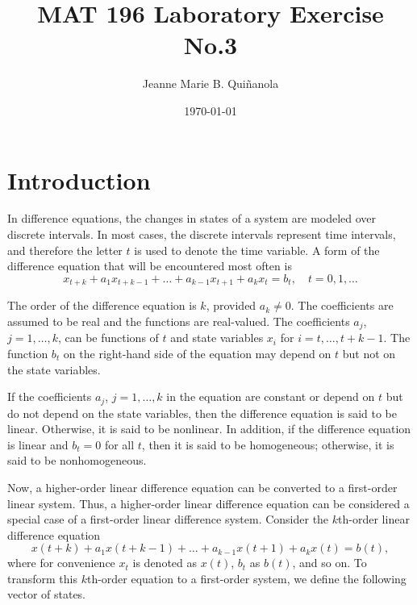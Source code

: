 \documentclass [a4paper]{article}
\title{MAT 196 Laboratory Exercise No.3}
\author{Jeanne Marie B. Quiñanola}
\date{\today}
\begin{document}
\maketitle

\section{Introduction}
In difference equations, the changes in states of a system are modeled over discrete intervals. In most cases, the discrete intervals represent time intervals, and therefore the letter \(t\) is used to denote the time variable.
A form of the difference equation that will be encountered most often is 
\[
x_{t + k} + a_1 x_{t+k-1} + \ldots + a_{k-1} x_{t+1} + a_k x_t = b_t, \quad t = 0, 1,\ldots\]

The order of the difference equation is \(k\), provided \(a_k \neq 0\). The coefficients are assumed to be real and the functions are real-valued. The coefficients \(a_j\), \(j = 1, \ldots, k\), can be functions of \(t\) and state variables \(x_i\) for \(i = t, \ldots, t + k - 1\). The function \(b_t\) on the right-hand side of the equation may depend on \(t\) but not on the state variables.

If the coefficients \(a_j\), \(j = 1, \ldots, k\) in the equation are constant or depend on \(t\) but do not depend on the state variables, then the difference equation is said to be linear. Otherwise, it is said to be nonlinear. In addition, if the difference equation is linear and \(b_t = 0\) for all \(t\), then it is said to be homogeneous; otherwise, it is said to be nonhomogeneous.

Now, a higher-order linear difference equation can be converted to a first-order linear system. Thus, a higher-order linear difference equation can be considered a special case of a first-order linear difference system. Consider the \(k\)th-order linear difference equation
\[
x(t + k) + a_1 x(t + k - 1) + \dots + a_{k-1} x(t + 1) + a_k x(t) = b(t),
\]
where for convenience \(x_t\) is denoted as \(x(t)\), \(b_t\) as \(b(t)\), and so on. To transform this \(k\)th-order equation to a first-order system, we define the following vector of states.
\end{document}
